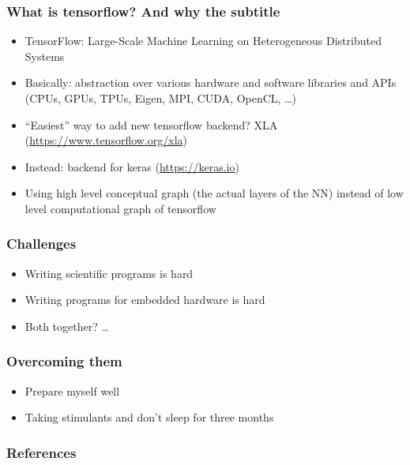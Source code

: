 \documentclass{beamer}
\begin{document}
\begin{frame}[fragile]
  \frametitle{What is tensorflow? And why the subtitle}
  \pause

  \begin{itemize}[<+->]
    \item TensorFlow: Large-Scale Machine Learning on
          Heterogeneous Distributed Systems \cite{tf_2015}
    \item Basically: abstraction over various hardware and
          software libraries and APIs (CPUs, GPUs, TPUs,
          Eigen, MPI, CUDA, OpenCL, \dots)
    \item ``Easiest'' way to add new tensorflow backend? XLA
          (\url{https://www.tensorflow.org/xla})
    \item Instead: backend for keras (\url{https://keras.io})
    \item Using high level conceptual graph (the actual
          layers of the NN) instead of low level
          computational graph of tensorflow
  \end{itemize}
\end{frame}

\begin{frame}[fragile]
  \frametitle{Challenges}
  \pause

  \begin{itemize}[<+->]
    \item Writing scientific programs is hard
    \item Writing programs for embedded hardware is hard
    \item Both together? \dots
  \end{itemize}
\end{frame}

\begin{frame}[fragile]
  \frametitle{Overcoming them}
  \pause

  \begin{itemize}[<+->]
    \item Prepare myself well
    \item Taking stimulants and don't sleep for three
          months
  \end{itemize}
\end{frame}

\begin{frame}
  \frametitle{References}
  
\end{frame}
\end{document}
